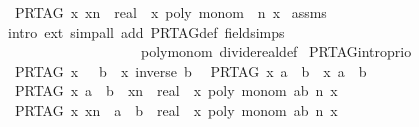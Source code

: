 \begin{isabellebody}
\ \ {\isachardoublequoteopen}PR{\isacharunderscore}TAG\ {\isacharparenleft}{\isasymlambda}x{\isachardot}\ x{\isacharcircum}n\ {\isacharcolon}{\isacharcolon}\ real{\isacharparenright}\ {\isacharequal}\ {\isacharparenleft}{\isasymlambda}x{\isachardot}\ poly\ {\isacharparenleft}monom\ {}\ n{\isacharparenright}\ x{\isacharparenright}{\isachardoublequoteclose}\isanewline
%
\isadelimproof
%
\endisadelimproof
%
\isatagproof
{}\isamarkupfalse%
\ assms\ \isamarkupfalse%
\ {\isacharparenleft}intro\ ext{\isacharcomma}\ simp{\isacharunderscore}all\ add{\isacharcolon}\ PR{\isacharunderscore}TAG{\isacharunderscore}def\ field{\isacharunderscore}simps\ \isanewline
\ \ \ \ \ \ \ \ \ \ \ \ \ \ \ \ \ \ \ \ poly{\isacharunderscore}monom\ divide{\isacharunderscore}real{\isacharunderscore}def{\isacharparenright}%
\endisatagproof
{\isafoldproof}%
%
\isadelimproof
\isanewline
%
\endisadelimproof
\isanewline
{}\isamarkupfalse%
\ PR{\isacharunderscore}TAG{\isacharunderscore}intro{\isacharunderscore}prio{}{\isacharcolon}\isanewline
\ \ {\isachardoublequoteopen}PR{\isacharunderscore}TAG\ {\isacharparenleft}{\isasymlambda}x{\isachardot}\ {}\ {\isacharslash}\ b{\isacharparenright}\ {\isacharequal}\ {\isacharparenleft}{\isasymlambda}x{\isachardot}\ inverse\ b{\isacharparenright}{\isachardoublequoteclose}\isanewline
\ \ {\isachardoublequoteopen}PR{\isacharunderscore}TAG\ {\isacharparenleft}{\isasymlambda}x{\isachardot}\ a\ {\isacharslash}\ b{\isacharparenright}\ {\isacharequal}\ {\isacharparenleft}{\isasymlambda}x{\isachardot}\ a\ {\isacharslash}\ b{\isacharparenright}{\isachardoublequoteclose}\isanewline
\ \ {\isachardoublequoteopen}PR{\isacharunderscore}TAG\ {\isacharparenleft}{\isasymlambda}x{\isachardot}\ a\ {\isacharslash}\ b\ {\isacharasterisk}\ x{\isacharcircum}n\ {\isacharcolon}{\isacharcolon}\ real{\isacharparenright}\ {\isacharequal}\ {\isacharparenleft}{\isasymlambda}x{\isachardot}\ poly\ {\isacharparenleft}monom\ {\isacharparenleft}a{\isacharslash}b{\isacharparenright}\ n{\isacharparenright}\ x{\isacharparenright}{\isachardoublequoteclose}\isanewline
\ \ {\isachardoublequoteopen}PR{\isacharunderscore}TAG\ {\isacharparenleft}{\isasymlambda}x{\isachardot}\ x{\isacharcircum}n\ {\isacharasterisk}\ a\ {\isacharslash}\ b\ {\isacharcolon}{\isacharcolon}\ real{\isacharparenright}\ {\isacharequal}\ {\isacharparenleft}{\isasymlambda}x{\isachardot}\ poly\ {\isacharparenleft}monom\ {\isacharparenleft}a{\isacharslash}b{\isacharparenright}\ n{\isacharparenright}\ x{\isacharparenright}{\isachardoublequoteclose}\isanewline

\end{isabellebody}

